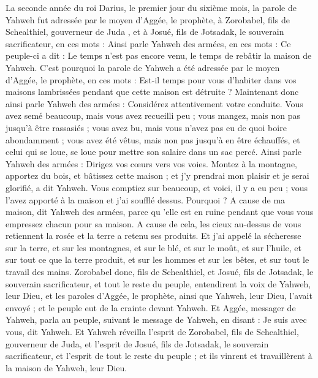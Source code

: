 \begin{multicols}{2}
\VerseOne{}La seconde année du roi Darius, le premier jour du sixième mois, la parole de Yahweh fut adressée par le moyen d'Aggée, le prophète, à Zorobabel, fils de Schealthiel, gouverneur de Juda , et à Josué, fils de Jotsadak, le souverain sacrificateur, en ces mots :
Ainsi parle Yahweh des armées, en ces mots : Ce peuple-ci a dit : Le temps n'est pas encore venu, le temps de rebâtir la maison de Yahweh.
C'est pourquoi la parole de Yahweh a été adressée par le moyen d'Aggée, le prophète, en ces mots :
Est-il temps pour vous d'habiter dans vos maisons lambrissées pendant que cette maison est détruite ?
Maintenant donc ainsi parle Yahweh des armées : Considérez attentivement votre conduite.
Vous avez semé beaucoup, mais vous avez recueilli peu ; vous mangez, mais non pas jusqu'à être rassasiés ; vous avez bu, mais vous n'avez pas eu de quoi boire abondamment ; vous avez été vêtus, mais non pas jusqu'à en être échauffés, et celui qui se loue, se loue pour mettre son salaire dans un sac percé.
Ainsi parle Yahweh des armées : Dirigez vos cœurs vers vos voies.
Montez à la montagne, apportez du bois, et bâtissez cette maison ; et j'y prendrai mon plaisir et je serai glorifié, a dit Yahweh.
Vous comptiez sur beaucoup, et voici, il y a eu peu ; vous l'avez apporté à la maison et j'ai soufflé dessus. Pourquoi ? A cause de ma maison, dit Yahweh des armées, parce qu 'elle est en ruine pendant que vous vous empressez chacun pour sa maison.
A cause de cela, les cieux au-dessus de vous retiennent la rosée et la terre a retenu ses produits.
Et j'ai appelé la sécheresse sur la terre, et sur les montagnes, et sur le blé, et sur le moût, et sur l'huile, et sur tout ce que la terre produit, et sur les hommes et sur les bêtes, et sur tout le travail des mains.
Zorobabel donc, fils de Schealthiel, et Josué, fils de Jotsadak, le souverain sacrificateur, et tout le reste du peuple, entendirent la voix de Yahweh, leur Dieu, et les paroles d'Aggée, le prophète, ainsi que Yahweh, leur Dieu, l'avait envoyé ; et le peuple eut de la crainte devant Yahweh.
Et Aggée, messager de Yahweh, parla au peuple, suivant le message de Yahweh, en disant : Je suis avec vous, dit Yahweh.
Et Yahweh réveilla l'esprit de Zorobabel, fils de Schealthiel, gouverneur de Juda, et l'esprit de Josué, fils de Jotsadak, le souverain sacrificateur, et l'esprit de tout le reste du peuple ; et ils vinrent et travaillèrent à la maison de Yahweh, leur Dieu.

\end{multicols}
